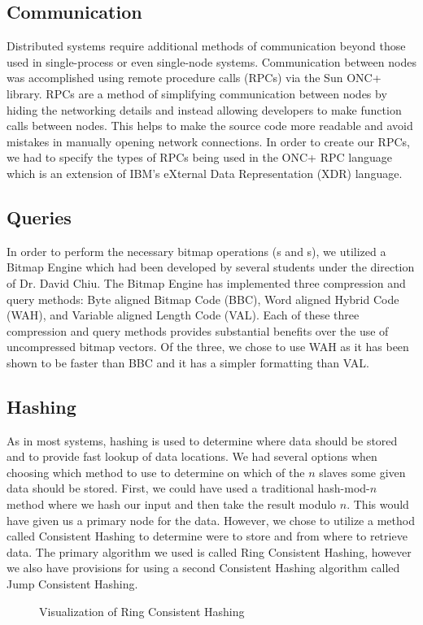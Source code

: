\subsection{Communication}
Distributed systems require additional methods of communication beyond those used in single-process or even single-node systems.
Communication between nodes was accomplished using remote procedure calls (RPCs) via the Sun ONC+ library.
RPCs are a method of simplifying communication between nodes by hiding the networking details and instead allowing developers to make function calls between nodes.
This helps to make the source code more readable and avoid mistakes in manually opening network connections.
In order to create our RPCs, we had to specify the types of RPCs being used in the ONC+ RPC language which is an extension of IBM's eXternal Data Representation (XDR) language.
%
\subsection{Queries}
In order to perform the necessary bitmap operations (s and s), we utilized a Bitmap Engine which had been developed by several students under the direction of Dr. David Chiu.
The Bitmap Engine has implemented three compression and query methods: Byte aligned Bitmap Code (BBC), Word aligned Hybrid Code (WAH), and Variable aligned Length Code (VAL).
Each of these three compression and query methods provides substantial benefits over the use of uncompressed bitmap vectors.
Of the three, we chose to use WAH as it has been shown to be faster than BBC and it has a simpler formatting than VAL.
%
\subsection{Hashing}
As in most systems, hashing is used to determine where data should be stored and to provide fast lookup of data locations.
We had several options when choosing which method to use to determine on which of the \(n\) slaves some given data should be stored.
First, we could have used a traditional hash-mod-\(n\) method where we hash our input and then take the result modulo \(n\).
This would have given us a primary node for the data.
However, we chose to utilize a method called Consistent Hashing to determine were to store and from where to retrieve data.
The primary algorithm we used is called Ring Consistent Hashing, however we also have provisions for using a second Consistent Hashing algorithm called Jump Consistent Hashing.
\begin{figure}
    \centering
    
    \caption{Visualization of Ring Consistent Hashing}
\end{figure}
%
